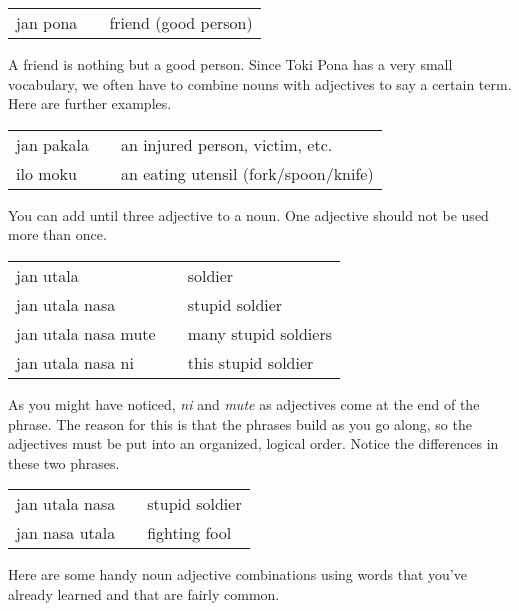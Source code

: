 \begin{supertabular}{p{5,5cm}|ll}
jan pona && friend (good person) \\
\end{supertabular} 

A friend is nothing but a good person.
Since Toki Pona has a very small vocabulary, we often have to combine nouns with adjectives to say a certain term. 
Here are further examples. 

\begin{supertabular}{p{5,5cm}|ll}
jan pakala && an injured person, victim, etc. \\
ilo moku && an eating utensil (fork/spoon/knife) \\
\end{supertabular} 

You can add until three adjective to a noun. 
One adjective should not be used more than once.

\begin{supertabular}{p{5,5cm}|ll}
jan utala && soldier  \\
jan utala nasa && stupid soldier  \\
jan utala nasa mute && many stupid soldiers  \\
jan utala nasa ni && this stupid soldier  \\
\end{supertabular} 

As you might have noticed, \textit{ni} and \textit{mute} as adjectives come at the end of the phrase. 
The reason for this is that the phrases build as you go along, so the adjectives must be put into an organized, logical order. 
Notice the differences in these two phrases.

\begin{supertabular}{p{5,5cm}|ll}
jan utala nasa && stupid soldier  \\
jan nasa utala && fighting fool \\
\end{supertabular}

Here are some handy noun adjective combinations using words that you've already learned and that are fairly common.

